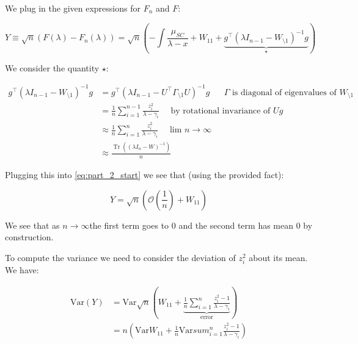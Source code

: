\documentclass{article}
\DeclareMathOperator{\Tr}{Tr}
\begin{document}
We plug in the given expressions for $F_n$ and $F$:

\begin{equation}\label{eq:part_2_start}
	Y \equiv \sqrt{n} \left(F \left( \lambda \right) - F_n \left( \lambda \right) \right)
	= \sqrt{n}\left(-\int \frac{\mu_{SC}}{\lambda-x} + W_{11} +
	\underbrace{g^\top \left( \lambda I_{n-1} - W_{\setminus 1} \right)^{-1}g  }_{\star}\right) 
\end{equation}

We consider the quantity $\star$:


\begin{equation}
\begin{split}
	g^\top \left( \lambda I_{n-1} - W_{\setminus 1} \right)^{-1}g 
	&= g^\top \left( \lambda I_{n-1} - U^\top\Gamma_{\setminus 1}U \right)^{-1}g \quad \text{ $\Gamma$ is diagonal of eigenvalues of $W_{\setminus 1}$ }\\ 
	&= \frac{1}{n} \sum^{n-1}_{i=1} \frac{z_i^2}{\lambda-\gamma_i} \quad \text{ by rotational invariance of $Ug$ } \\
	&\approx 	\frac{1}{n} \sum^{n}_{i=1} \frac{z_i^2}{\lambda-\gamma_i} \quad \text{ lim $n\rightarrow\infty$} \\
	&\approx \frac{\Tr\left( \left( \lambda I_n - W \right)^{-1} \right)}{n}
\end{split}
\end{equation}

Plugging this into \ref{eq:part_2_start} we see that (using the provided fact):

\begin{equation}
	Y = \sqrt{n} \left( \mathcal{O}\left( \frac{1}{n}  \right) + W_{11}\right)
\end{equation}

We see that as $n\rightarrow\infty$the first term goes to 0 and the second term has mean 0 by construction.

To compute the variance we need to consider the deviation of $z_i^2$ about its mean. We have: 

\begin{equation}
\begin{split}
	\text{Var} \left( Y \right) 
	&= \text{Var} \sqrt{n}\left( W_{11} + \underbrace{\frac{1}{n}\sum^{n}_{i=1}\frac{z_i^2 - 1}{\lambda-\gamma_i}  }_{\text{error}} \right) \\
	&= n \left( \text{Var} W_{11} + \frac{1}{n} \text{Var} sum^{n}_{i=1}\frac{z_i^2 - 1}{\lambda-\gamma_i}  \right)
\end{split}
\end{equation}
\end{document}
